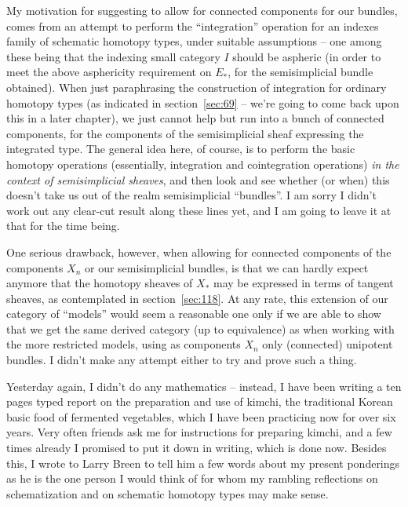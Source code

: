 My motivation for suggesting to allow for connected components for our
bundles, comes from an attempt to perform the ``integration''
operation for an indexes family of schematic homotopy types, under
suitable assumptions -- one among these being that the indexing small
category $I$ should be aspheric (in order to meet the above
asphericity requirement on $E_*$, for the semisimplicial bundle
obtained). When just paraphrasing the construction of integration for
ordinary homotopy types (as indicated in section~\ref{sec:69} -- we're
going to come back upon this in a later chapter), we just cannot help
but run into a bunch of connected components, for the components of
the semisimplicial sheaf expressing the integrated type. The general
idea here, of course, is to perform the basic homotopy operations
(essentially, integration and cointegration operations) \emph{in the
  context of semisimplicial sheaves}, and then look and see whether
(or when) this doesn't take us out of the realm semisimplicial
``bundles''. I am sorry I didn't work out any clear-cut result along
these lines yet, and I am going to leave it at that for the time
being.

One serious drawback, however, when allowing for connected components
of the components $X_n$ or our semisimplicial bundles, is that we can
hardly expect anymore that the homotopy sheaves of $X_*$ may be
expressed in terms of tangent sheaves, as contemplated in
section~\ref{sec:118}. At any rate, this extension of our category of
``models'' would seem a reasonable one only if we are able to show
that we get the same derived category (up to equivalence) as when
working with the more restricted models, using as components $X_n$
only (connected) unipotent bundles. I didn't make any attempt either
to try and prove such a thing.

\presectionfill{}\par

\label{sec:131}%
Yesterday again, I didn't do any mathematics -- instead, I have been
writing a ten pages typed report on the preparation and use of kimchi,
the traditional Korean basic food of fermented vegetables, which I
have been practicing now for over six years. Very often friends ask me
for instructions for preparing kimchi, and a few times already I
promised to put it down in writing, which is done now. Besides this, I
wrote to Larry Breen to tell him a few words about my present
ponderings as he is the one person I would think of for whom my
rambling reflections on schematization and on schematic
homotopy types may make sense.

